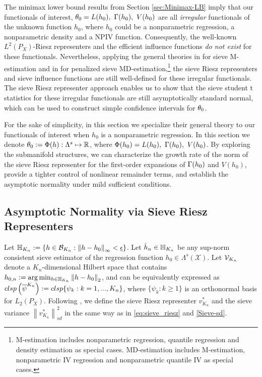 \documentclass[12pt,american]{article}
\theoremstyle{definition}
\theoremstyle{plain}
\theoremstyle{definition}
\theoremstyle{plain}
\theoremstyle{plain}
\theoremstyle{plain}
\theoremstyle{plain}
\theoremstyle{plain}
\newcommand{\R}{\mathbb{R}}
\newcommand{\norm}[1]{\left\| #1 \right\|}
\begin{document}
The minimax lower bound results from Section \ref{sec:Minimax-LB} imply that our functionals of interest, $\theta_0=L(h_0),~\Gamma(h_0),~V(h_0)$ are all \textit{irregular} functionals of the unknown function $h_0$, where $h_0$ could be a nonparametric regression, a nonparametric density and a NPIV function. Consequently, the well-known $L^2(P_X)$-Riesz representers and the efficient influence functions \textit{do not exist} for these functionals. Nevertheless, applying the general theories in \citet*{chen2014sieve,chen2014sieveM} for sieve M-estimation and in \cite*{chenpouzo2015sieve} for penalized sieve MD-estimation,\footnote{M-estimation includes nonparametric regression, quantile regression and density estimation as special cases. MD-estimation includes M-estimation, nonparametric IV regression and nonparametric quantile IV as special cases.} the sieve Riesz representers and sieve influence functions are still well-defined for these irregular functionals. The sieve Riesz representer approach enables us to show that the sieve student t statistics for these irregular functionals are still asymptotically standard normal, which can be used to construct simple confidence intervals for $\theta_0$.

For the sake of simplicity, in this section we specialize their general theory to our functionals of interest when $h_0$ is a nonparametric regression. In this section we denote $\t_0:=\Phi(h):\Lambda^s\mapsto\R$, where $\Phi(h_0)=L(h_0),~\Gamma(h_0),~V(h_0)$. By exploring the submanifold structures, we can characterize the
growth rate of the norm of the sieve Riesz representer for the first-order expansions of $\Gamma(h_0)$ and $V(h_0)$, provide a tighter control of nonlinear remainder terms, and establish the asymptotic normality under mild sufficient conditions.

\subsection{Asymptotic Normality via Sieve Riesz Representers}

Let $\H_{K_{n}}:=\left\{ h\in{\cal B}_{K_{n}}:\norm{h-h_{0}}_{\infty}<\ul{\e}\right\} $. Let $\hat{h}_n \in \mathbb{H}_{K_n}$ be any sup-norm consistent sieve estimator of the regression function $h_0\in\Lambda^s(\mathcal{X})$. Let ${\cal V}_{K_n}$ denote a $K_n$-dimensional Hilbert space that contains $h_{0,n}:=\arg\min_{h\in \H_{K_{n}}}\norm{h-h_0}_2$, and can be equivalently expressed as $clsp\left(\overline{\psi}^{K_n}\right):=clsp\{\psi_k:k=1,...,K_n\}$, where $\{\psi_k:k\geq 1\}$ is an orthonormal basis for $L_2(P_X)$. Following \citet*{chen2014sieve,chen2014sieveM}, we define the sieve Riesz representer $v_{K_n}^{*}$
and the sieve variance $\norm{v^*_{K_n}}_{sd}^2$ in the same way as in \eqref{eq:sieve_riesz} and \eqref{Sieve-sd}.
\end{document}

